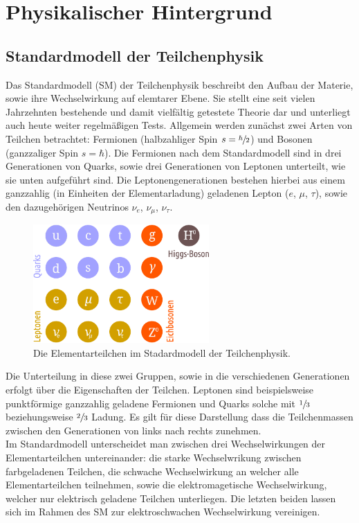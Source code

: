 \chapter{Physikalischer Hintergrund}
%
\section{Standardmodell der Teilchenphysik}
%
Das Standardmodell (SM) der Teilchenphysik beschreibt den Aufbau der Materie, sowie ihre Wechselwirkung auf elemtarer Ebene. Sie stellt eine seit vielen Jahrzehnten bestehende und damit vielfältig getestete Theorie dar und unterliegt auch heute weiter regelmäßigen Tests. Allgemein werden zunächst zwei Arten von Teilchen betrachtet: Fermionen (halbzahliger Spin $s=\sfrac{\hbar}{2}$) und Bosonen (ganzzaliger Spin $s=\hbar$). Die Fermionen nach dem Standardmodell sind in drei Generationen von Quarks, sowie drei Generationen von Leptonen unterteilt, wie sie unten aufgeführt sind. Die Leptonengenerationen bestehen hierbei aus einem ganzzahlig (in Einheiten der Elementarladung) geladenen Lepton ($e$, $\mu$, $\tau$), sowie den dazugehörigen Neutrinos $\nu_e$, $\nu_\mu$, $\nu_\tau$.
%
\begin{figure}
  \centering
      \includegraphics[width=0.6\textwidth]{content/SM.pdf}
  \caption{Die Elementarteilchen im Stadardmodell der Teilchenphysik.}
\end{figure}
%
Die Unterteilung in diese zwei Gruppen, sowie in die verschiedenen Generationen erfolgt über die Eigenschaften der Teilchen. Leptonen sind beispielsweise punktförmige ganzzahlig geladene Fermionen und Quarks solche mit $\sfrac{1}{3}$ beziehungsweise $\sfrac{2}{3}$ Ladung. Es gilt für diese Darstellung dass die Teilchenmassen zwischen den Generationen von links nach rechts zunehmen.\\
Im Standardmodell unterscheidet man zwischen drei Wechselwirkungen der Elementarteilchen untereinander: die starke Wechselwrikung zwischen farbgeladenen Teilchen, die schwache Wechselwirkung an welcher alle Elementarteilchen teilnehmen, sowie die elektromagetische Wechselwirkung, welcher nur elektrisch geladene Teilchen unterliegen. Die letzten beiden lassen sich im Rahmen des SM zur elektroschwachen Wechselwirkung vereinigen.
